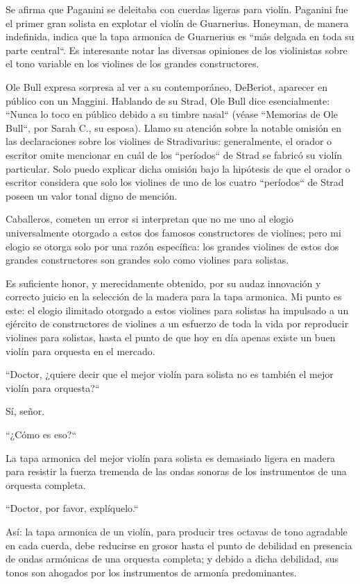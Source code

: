 \documentclass[12pt]{book}
\begin{document}
Se afirma que Paganini se deleitaba con cuerdas ligeras para violín. Paganini fue el primer gran solista en explotar el violín de Guarnerius. Honeyman, de manera indefinida, indica que la tapa armonica de Guarnerius es ``más delgada en toda su parte central``. Es interesante notar las diversas opiniones de los violinistas sobre el tono variable en los violines de los grandes constructores.

Ole Bull expresa sorpresa al ver a su contemporáneo, DeBeriot, aparecer en público con un Maggini. Hablando de su Strad, Ole Bull dice esencialmente: ``Nunca lo toco en público debido a su timbre nasal`` (véase ``Memorias de Ole Bull``, por Sarah C., su esposa). Llamo su atención sobre la notable omisión en las declaraciones sobre los violines de Stradivarius: generalmente, el orador o escritor omite mencionar en cuál de los ``períodos`` de Strad se fabricó su violín particular. Solo puedo explicar dicha omisión bajo la hipótesis de que el orador o escritor considera que solo los violines de uno de los cuatro ``períodos`` de Strad poseen un valor tonal digno de mención.

Caballeros, cometen un error si interpretan que no me uno al elogio universalmente otorgado a estos dos famosos constructores de violines; pero mi elogio se otorga solo por una razón específica: los grandes violines de estos dos grandes constructores son grandes solo como violines para solistas.

Es suficiente honor, y merecidamente obtenido, por su audaz innovación y correcto juicio en la selección de la madera para la tapa armonica. Mi punto es este: el elogio ilimitado otorgado a estos violines para solistas ha impulsado a un ejército de constructores de violines a un esfuerzo de toda la vida por reproducir violines para solistas, hasta el punto de que hoy en día apenas existe un buen violín para orquesta en el mercado.

``Doctor, ¿quiere decir que el mejor violín para solista no es también el mejor violín para orquesta?``

Sí, señor.

``¿Cómo es eso?``

La tapa armonica del mejor violín para solista es demasiado ligera en madera para resistir la fuerza tremenda de las ondas sonoras de los instrumentos de una orquesta completa.

``Doctor, por favor, explíquelo.``

Así: la tapa armonica de un violín, para producir tres octavas de tono agradable en cada cuerda, debe reducirse en grosor hasta el punto de debilidad en presencia de ondas armónicas de una orquesta completa; y debido a dicha debilidad, sus tonos son ahogados por los instrumentos de armonía predominantes.
\end{document}
